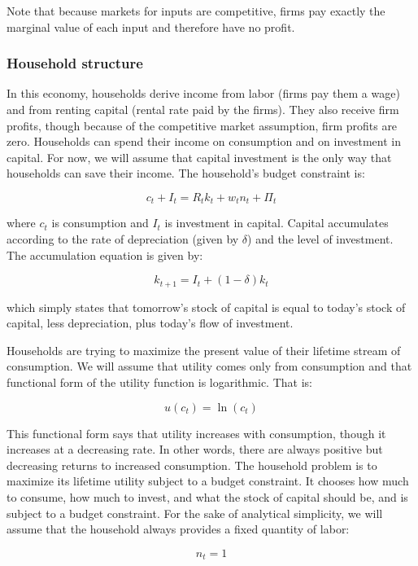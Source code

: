 \documentclass[12pt]{article}
\begin{document}
Note that because markets for inputs are competitive, firms pay exactly the marginal value of each input and therefore have no profit.

\subsubsection{Household structure}

In this economy, households derive income from labor (firms pay them a wage) and from renting capital (rental rate paid by the firms). They also receive firm profits, though because of the competitive market assumption, firm profits are zero. Households can spend their income on consumption and on investment in capital. For now, we will assume that capital investment is the only way that households can save their income. The household's budget constraint is:

\[ c_t + I_t = R_t k_t + w_t n_t + \Pi_t \]

where \(c_t\) is consumption and \(I_t\) is investment in capital. Capital accumulates according to the rate of depreciation (given by \(\delta\)) and the level of investment. The accumulation equation is given by:

\begin{equation}
k_{t+1} = I_t + (1-\delta) k_t
\end{equation}

which simply states that tomorrow's stock of capital is equal to today's stock of capital, less depreciation, plus today's flow of investment.

Households are trying to maximize the present value of their lifetime stream of consumption. We will assume that utility comes only from consumption and that functional form of the utility function is logarithmic. That is:

\[ u(c_t) = \ln(c_t) \]

This functional form says that utility increases with consumption, though it increases at a decreasing rate. In other words, there are always positive but decreasing returns to increased consumption. The household problem is to maximize its lifetime utility subject to a budget constraint. It chooses how much to consume, how much to invest, and what the stock of capital should be, and is subject to a budget constraint. For the sake of analytical simplicity, we will assume that the household always provides a fixed quantity of labor: 

\begin{equation}
n_t = 1
\end{equation}
\end{document}
